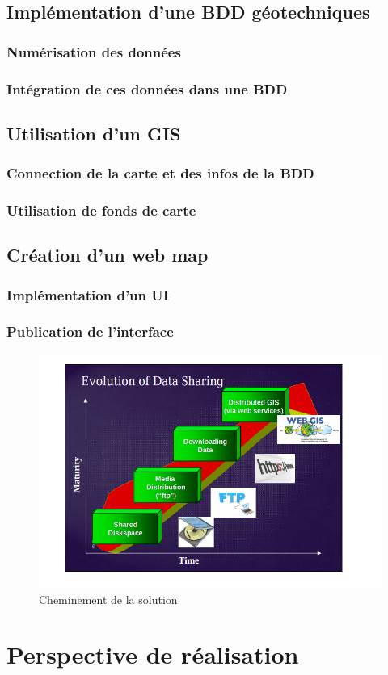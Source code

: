     \subsection{Implémentation d'une BDD géotechniques}
        \subsubsection{Numérisation des données}
        \subsubsection{Intégration de ces données dans une BDD}
    \subsection{Utilisation d'un GIS}
        \subsubsection{Connection de la carte et des infos de la BDD}
        \subsubsection{Utilisation de fonds de carte}
    \subsection{Création d'un web map} 
        \subsubsection{Implémentation d'un UI}
        \subsubsection{Publication de l'interface}
    \begin{figure}[t]
        \centering
        \includegraphics[width=1\textwidth]{images/evolution_projetGIS.png}
        \caption{Cheminement de la solution}
    \end{figure}

\section{Perspective de réalisation}